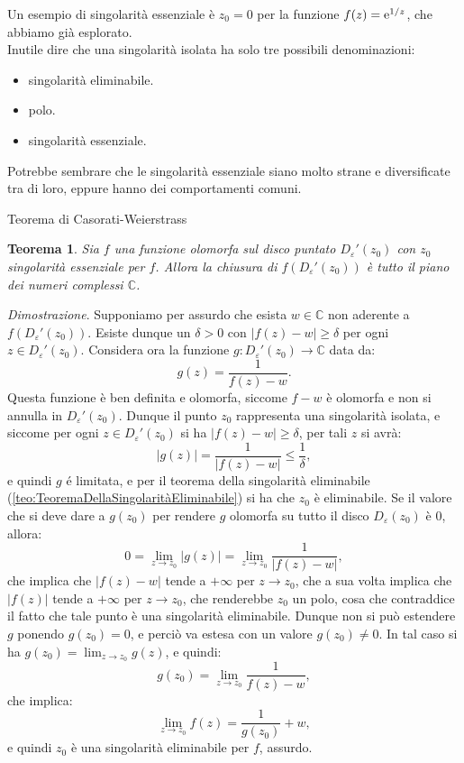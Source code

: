 \documentclass[11pt]{book}
\makeatletter
\theoremstyle{Definizione}
\theoremstyle{TeoremaProposizioneLemmaCorollarioCongettura}
\newtheorem{myteo}{Teorema}[section]
\theoremstyle{OsservazioneNotaEsempio}
\renewenvironment{proof}[1][\proofname]{\par
  \normalfont \topsep6\p@\@plus6\p@\relax
  \trivlist
  \item[\hskip\labelsep
        \itshape
    #1\@addpunct{.}]\ignorespaces
}{%
  \endtrivlist\@endpefalse
}
\renewenvironment{proof}{\textsl{Dimostrazione}.}{}
\newcommand{\C}{\mathbb{C}}
\newcommand{\Disc}[3][]{D^{#1}_{{#2}}({#3})}
\newcommand{\DiscPunt}[2]{D_{#1}'({#2})}
\newcommand{\e}{\textup{e}}
\makeatother
\begin{document}
\noindent
Un esempio di singolarità essenziale è $z_0 = 0$ per la funzione $f(z) = \e^{1/z}$, che abbiamo già esplorato.\\
Inutile dire che una singolarità isolata ha solo tre possibili denominazioni:
\begin{itemize}
\item singolarità eliminabile.
\item polo.
\item singolarità essenziale.
\end{itemize}
Potrebbe sembrare che le singolarità essenziale siano molto strane e diversificate tra di loro, eppure hanno dei comportamenti comuni.
\begin{boxteo}{Teorema di Casorati-Weierstrass}
\begin{myteo}\label{teo:TeoremaDiCasoratiWeierstrass}
Sia $f$ una funzione olomorfa sul disco puntato $\DiscPunt{\varepsilon}{z_0}$ con $z_0$ singolarità essenziale per $f$. Allora la chiusura di $f(\DiscPunt{\varepsilon}{z_0})$ è tutto il piano dei numeri complessi $\C$.
\end{myteo}
\tcblower
\begin{proof}
Supponiamo per assurdo che esista $w\in \C$ non aderente a $f(\DiscPunt{\varepsilon}{z_0})$. Esiste dunque un $\delta > 0$ con $|f(z)-w|\geq \delta$ per ogni $z\in \DiscPunt{\varepsilon}{z_0}$. Considera ora la funzione $g:\DiscPunt{\varepsilon}{z_0} \longrightarrow \C$ data da:
$$
g(z) =\frac{1}{f(z)-w}.
$$
Questa funzione è ben definita e olomorfa, siccome $f-w$ è olomorfa e non si annulla in $\DiscPunt{\varepsilon}{z_0}$. Dunque il punto $z_0$ rappresenta una singolarità isolata, e siccome per ogni $z\in \DiscPunt{\varepsilon}{z_0}$ si ha $|f(z)-w|\geq \delta$, per tali $z$ si avrà:
$$
|g(z)| = \frac{1}{|f(z)-w|} \leq \frac{1}{\delta},
$$
e quindi $g$ é limitata, e per il teorema della singolarità eliminabile (\ref{teo:TeoremaDellaSingolaritàEliminabile}) si ha che $z_0$ è eliminabile. Se il valore che si deve dare a $g(z_0)$ per rendere $g$ olomorfa su tutto il disco $\Disc{\varepsilon}{z_0}$ è $0$, allora:
$$
0 = \lim_{z \to z_0} |g(z)| = \lim_{z \to z_0} \frac{1}{|f(z)-w|},
$$
che implica che $|f(z)-w|$ tende a $+\infty$ per $z \to z_0$, che a sua volta implica che $|f(z)|$ tende a $+\infty$ per $z \to z_0$, che renderebbe $z_0$ un polo, cosa che contraddice il fatto che tale punto è una singolarità eliminabile. Dunque non si può estendere $g$ ponendo $g(z_0) = 0$, e perciò va estesa con un valore $g(z_0) \neq 0$. In tal caso si ha $g(z_0) = \lim_{z \to z_0} g(z)$, e quindi:
$$
g(z_0) = \lim_{z \to z_0} \frac{1}{f(z)-w},
$$
che implica:
$$
\lim_{z \to z_0} f(z) = \frac{1}{g(z_0)} + w,
$$
e quindi $z_0$ è una singolarità eliminabile per $f$, assurdo.
\end{proof}
\end{boxteo}
\end{document}
